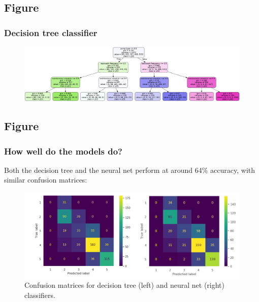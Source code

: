 \documentclass[
	11pt, %
]{beamer}
\begin{document}

\subsection{Figure}

\begin{frame}
	\frametitle{Decision tree classifier}
	
	\begin{figure}
		\includegraphics[width=1.0\linewidth]{decision_tree_graphviz.png}
	\end{figure}
\end{frame}

\subsection{Figure}

\begin{frame}
	\frametitle{How well do the models do?}

	\begin{text}
	   Both the decision tree and the neural net perform at around 64\% accuracy, with similar confusion matrices:
	\end{text}

	\begin{figure}
	   \includegraphics[width=0.95\linewidth]{confusion_matrices.png}\caption{Confusion matrices for decision tree (left) and neural net (right) classifiers.}
	\end{figure}
\end{frame}
\end{document}
